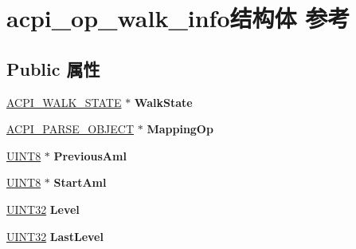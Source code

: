 \hypertarget{structacpi__op__walk__info}{}\section{acpi\+\_\+op\+\_\+walk\+\_\+info结构体 参考}
\label{structacpi__op__walk__info}
\subsection*{Public 属性}
\begin{DoxyCompactItemize}
\item 
\mbox{\label{structacpi__op__walk__info_a6649f1acf2f6f07d3cafadee32ffea8b}} 
\hyperlink{structacpi__walk__state}{A\+C\+P\+I\+\_\+\+W\+A\+L\+K\+\_\+\+S\+T\+A\+TE} $\ast$ {\bfseries Walk\+State}
\item 
\mbox{\label{structacpi__op__walk__info_a6b131a305352031396190d67d7580b4d}} 
\hyperlink{unionacpi__parse__object}{A\+C\+P\+I\+\_\+\+P\+A\+R\+S\+E\+\_\+\+O\+B\+J\+E\+CT} $\ast$ {\bfseries Mapping\+Op}
\item 
\mbox{\label{structacpi__op__walk__info_a5540fda5ad2bcae257587e41158f5728}} 
\hyperlink{_processor_bind_8h_ab27e9918b538ce9d8ca692479b375b6a}{U\+I\+N\+T8} $\ast$ {\bfseries Previous\+Aml}
\item 
\mbox{\label{structacpi__op__walk__info_a4c1d20b3c1888d672710238c3880b1f4}} 
\hyperlink{_processor_bind_8h_ab27e9918b538ce9d8ca692479b375b6a}{U\+I\+N\+T8} $\ast$ {\bfseries Start\+Aml}
\item 
\mbox{\label{structacpi__op__walk__info_ae146879d425a3c72344294111736093e}} 
\hyperlink{_processor_bind_8h_ae1e6edbbc26d6fbc71a90190d0266018}{U\+I\+N\+T32} {\bfseries Level}
\item 
\mbox{\label{structacpi__op__walk__info_a3c0610d488688e6a5f738af9fbe416cc}} 
\hyperlink{_processor_bind_8h_ae1e6edbbc26d6fbc71a90190d0266018}{U\+I\+N\+T32} {\bfseries Last\+Level}
\item 
\mbox{\label{structacpi__op__walk__info_a86dec68fdf0fb5a467e0d60408fc55e6}} 

\end{DoxyCompactItemize}
